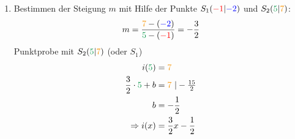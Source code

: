 \begin{Answer}[ref=punktprobeA2]
\begin{minipage}[t]{0.5\textwidth}
\begin{enumerate}[label=\alph*)]
			\item Bestimmen der Steigung \(m\) mit Hilfe der Punkte \(S_1(\textcolor{red}{-1}\vert\textcolor{blue}{-2})\) und \(S_2(\textcolor{ForestGreen}{5}\vert\textcolor{YellowOrange}{7})\):
			\begin{align*}
				m=\dfrac{\textcolor{YellowOrange}{7}-\left(\textcolor{blue}{-2}\right)}{\textcolor{ForestGreen}{5}-\left(\textcolor{red}{-1}\right)}=-\dfrac{3}{2}
			\end{align*}
			Punktprobe mit \(S_2(\textcolor{ForestGreen}{5}\vert\textcolor{YellowOrange}{7})\) (oder \(S_1\))
			\begin{align*}
				i(\textcolor{ForestGreen}{5})&=\textcolor{YellowOrange}{7}\\
				\dfrac{3}{2}\cdot\textcolor{ForestGreen}{5}+b&=\textcolor{YellowOrange}{7}\ \vert -\tfrac{15}{2}\\
				b&=-\dfrac{1}{2}\\
				\Rightarrow i(x)&=\dfrac{3}{2}x-\dfrac{1}{2}
			\end{align*}
		\end{enumerate}
	\end{minipage}%
\end{Answer}